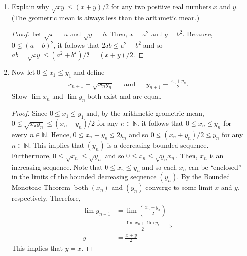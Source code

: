 \documentclass[12pt]{article}
\newcommand{\N}{\mathbb{N}}
\newenvironment{problem}[2][Problem]{\begin{trivlist} \item[\hskip \labelsep {\bfseries #1}\hskip \labelsep {\bfseries #2.}]}{\end{trivlist}}
\begin{document}
\begin{problem}{2.4.6 (Arithmetic-Geometric Mean)}
\begin{enumerate}
  \item Explain why $\sqrt{xy} \leq (x+y)/2$ for any two positive real numbers $x$ and $y$. (The geometric mean is always less than the arithmetic mean.)
\begin{proof}
  Let $\sqrt{x}=a$ and $\sqrt{y}=b$. Then, $x=a^{2}$ and $y=b^{2}$. Because, $0\leq (a-b)^{2}$, it follows that $2ab\leq a^{2}+b^{2}$ and so $ab = \sqrt{xy} \leq (a^{2}+b^{2})/2 = (x+y)/2$.
\end{proof}
  \item Now let $0\leq x_{1} \leq y_{1}$ and define
\begin{align*}
  x_{n+1} = \sqrt{x_{n}y_{n}}& &\text{and}& &y_{n+1} = \frac{x_{n}+y_{n}}{2}.
\end{align*}
Show $\lim x_{n}$ and $\lim y_{n}$ both exist and are equal.
\begin{proof}
  Since $0\leq x_{1} \leq y_{1}$  and, by the arithmetic-geometric mean, $0\leq \sqrt{x_{n}y_{n}}\leq (x_{n}+y_{n})/2$ for any $n\in \N$, it follows that $0\leq x_{n} \leq y_{n}$ for every $n\in \N$. Hence, $0\leq x_{n} + y_{n} \leq 2y_{n}$ and so $0\leq (x_{n}+y_{n})/2 \leq y_{n}$ for any $n\in \N$. This implies that $(y_{n})$ is a decreasing bounded sequence. \\

  Furthermore, $0\leq \sqrt{x_{n}}\leq \sqrt{y_{n}}$ and so $0\leq x_{n} \leq \sqrt{y_{n}x_{n}}$. Then, $x_{n}$ is an increasing sequence. Note that $0\leq x_{n}\leq y_{n}$ and so each $x_{n}$ can be ``enclosed'' in the limits of the bounded decreasing sequence $(y_{n})$. By the Bounded Monotone Theorem, both $(x_{n})$ and $(y_{n})$ converge to some limit $x$ and $y$, respectively. Therefore, 
\begin{align*}
  \lim y_{n+1} &= \lim \left( \frac{x_{n}+y_{n}}{2} \right)\\
  &= \frac{\lim x_{n} + \lim y_{n}}{2} \implies\\
  y &= \frac{x+y}{2}.
\end{align*}
This implies that $y=x$. 
\end{proof}
\end{enumerate}
\end{problem}
\end{document}
